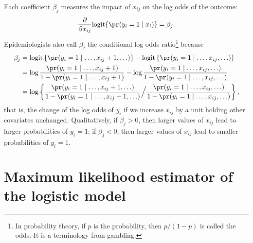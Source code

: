 Each coefficient $\beta_{j}$ measures the impact of $x_{ij}$ on the log odds of the outcome:
 $$
 \frac{ \partial  }{  \partial x_{ij} }  \text{logit} \{ \pr(y_{i}=1\mid   x_i ) \} = \beta_j .
 $$
Epidemiologists also call $\beta_{j}$ the
 conditional
log odds ratio\footnote{In probability theory, if $p$ is the probability, then $p/(1-p)$ is called the odds. It is a terminology from gambling.} because 
\begin{align*}
\beta_{j} & =\text{logit}\left\{ \pr(y_{i}=1\mid  \ldots,x_{ij}+1,\ldots )\right\} -\text{logit}\left\{ \pr(y_{i}=1\mid  \ldots,x_{ij},\ldots )\right\} \\
 & =\log\frac{\pr(y_{i}=1\mid  \ldots,x_{ij}+1 )}{1-\pr(y_{i}=1\mid  \ldots,x_{ij}+1 )} 
 - \log\frac{\pr(y_{i}=1\mid  \ldots,x_{ij},\ldots )}{1-\pr(y_{i}=1\mid  \ldots,x_{ij},\ldots )} \\
 &= \log \left\{
 \frac{\pr(y_{i}=1\mid \ldots,x_{ij}+1,\ldots )}{1-\pr(y_{i}=1\mid  \ldots,x_{ij}+1,\ldots )} 
 \Big/
\frac{\pr(y_{i}=1\mid  \ldots,x_{ij},\ldots )}{1-\pr(y_{i}=1\mid  \ldots,x_{ij},\ldots )} 
 \right\},
\end{align*}
that is, the change of the log odds of $y_{i}$ if we increase $x_{ij}$
by a unit holding other covariates unchanged. 
Qualitatively, if $\beta_j >0$, then larger values of $x_{ij}$ lead to larger probabilities of $y_i = 1$; if $\beta_j < 0$, then larger values of $x_{ij}$ lead to smaller probabilities of $y_i = 1$. 





\section{Maximum likelihood estimator of the logistic model}

